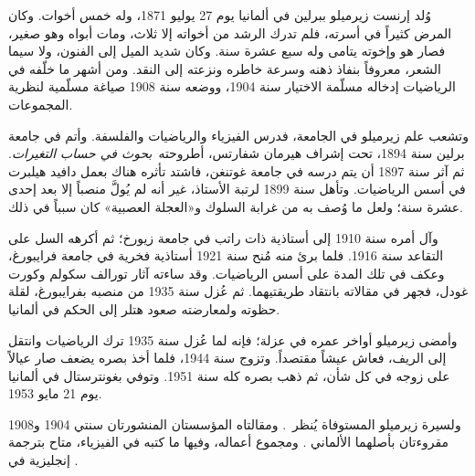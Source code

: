 \documentclass[../../../include/open-logic-section]{subfiles}
\begin{document}



وُلد إرنست زيرميلو ببرلين في ألمانيا يوم 27 يوليو 1871، وله خمس أخوات.
وكان المرض كثيراً في أسرته، فلم تدرك الرشد من أخواته إلا ثلاث، ومات أبواه
وهو صغير، فصار هو وإخوته يتامى وله سبع عشرة سنة. وكان شديد الميل إلى
الفنون، ولا سيما الشعر، معروفاً بنفاذ ذهنه وسرعة خاطره ونزعته إلى النقد.
ومن أشهر ما خلّفه في الرياضيات إدخاله مسلّمة الاختيار سنة 1904، ووضعه سنة
1908 صياغة مسلّمية لنظرية المجموعات.

وتشعب علم زيرميلو في الجامعة، فدرس الفيزياء والرياضيات والفلسفة. وأتم في
جامعة برلين سنة 1894، تحت إشراف هيرمان شفارتس، أطروحته~\emph{بحوث في
حساب التغيرات}. ثم آثر سنة 1897 أن يتم درسه في جامعة غوتنغن، فاشتد تأثره
هناك بعمل دافيد هيلبرت في أسس الرياضيات. وتأهل سنة 1899 لرتبة الأستاذ،
غير أنه لم يُولَّ منصباً إلا بعد إحدى عشرة سنة؛ ولعل ما وُصف به من غرابة
السلوك و«العجلة العصبية» كان سبباً في ذلك.

وآل أمره سنة 1910 إلى أستاذية ذات راتب في جامعة زيورخ؛ ثم أكرهه السل على
التقاعد سنة 1916. فلما برئ منه مُنح سنة 1921 أستاذية فخرية في جامعة
فرايبورغ، وعكف في تلك المدة على أسس الرياضيات. وقد ساءته آثار تورالف سكولم
وكورت غودل، فجهر في مقالاته بانتقاد طريقتيهما. ثم عُزل سنة 1935 من منصبه
بفرايبورغ، لقلة حظوته ولمعارضته صعود هتلر إلى الحكم في ألمانيا.

وأمضى زيرميلو أواخر عمره في عزلة؛ فإنه لما عُزل سنة 1935 ترك الرياضيات
وانتقل إلى الريف، فعاش عيشاً مقتصداً. وتزوج سنة 1944، فلما أخذ بصره يضعف
صار عيالاً على زوجه في كل شأن، ثم ذهب بصره كله سنة 1951. وتوفي بغونترستال
في ألمانيا يوم 21 مايو 1953.

\begin{reading}
ولسيرة زيرميلو المستوفاة يُنظر~\citet{Ebbinghaus2015}. ومقالتاه المؤسستان
المنشورتان سنتي 1904 و1908 مقروءتان بأصلهما الألماني
\citep{Zermelo1904,Zermelo1908}. ومجموع أعماله، وفيها ما كتبه في
الفيزياء، متاح بترجمة إنجليزية في
\citep{Ebbinghaus2010,Ebbinghaus2013}.
\end{reading}
\end{document}
